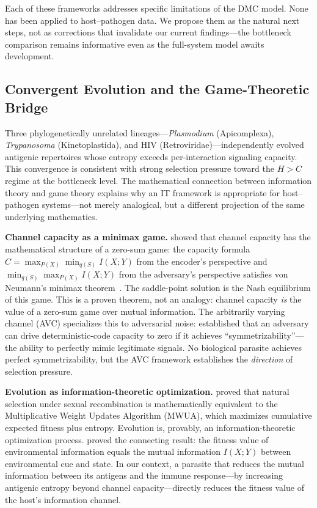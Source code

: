 \documentclass[twocolumn,10pt]{article}
\begin{document}
Each of these frameworks addresses specific limitations of the DMC model.  None has been applied to host--pathogen data.  We propose them as the natural next steps, not as corrections that invalidate our current findings---the bottleneck comparison remains informative even as the full-system model awaits development.

\subsection{Convergent Evolution and the Game-Theoretic Bridge}
\label{sec:convergence}

Three phylogenetically unrelated lineages---\textit{Plasmodium} (Apicomplexa), \textit{Trypanosoma} (Kinetoplastida), and HIV (Retroviridae)---independently evolved antigenic repertoires whose entropy exceeds per-interaction signaling capacity.  This convergence is consistent with strong selection pressure toward the $H > C$ regime at the bottleneck level.  The mathematical connection between information theory and game theory explains why an IT framework is appropriate for host--pathogen systems---not merely analogical, but a different projection of the same underlying mathematics.

\textbf{Channel capacity as a minimax game.}  \citet{gallager1968} showed that channel capacity has the mathematical structure of a zero-sum game: the capacity formula $C = \max_{P(X)} \min_{q(S)} I(X;Y)$ from the encoder's perspective and $\min_{q(S)} \max_{P(X)} I(X;Y)$ from the adversary's perspective satisfies von Neumann's minimax theorem~\citep{vonneumann1928}.  The saddle-point solution is the Nash equilibrium of this game.  This is a proven theorem, not an analogy: channel capacity \emph{is} the value of a zero-sum game over mutual information.  The arbitrarily varying channel (AVC) specializes this to adversarial noise: \citet{csiszar1988} established that an adversary can drive deterministic-code capacity to zero if it achieves ``symmetrizability''---the ability to perfectly mimic legitimate signals.  No biological parasite achieves perfect symmetrizability, but the AVC framework establishes the \emph{direction} of selection pressure.

\textbf{Evolution as information-theoretic optimization.}  \citet{chastain2014} proved that natural selection under sexual recombination is mathematically equivalent to the Multiplicative Weight Updates Algorithm (MWUA), which maximizes cumulative expected fitness plus entropy.  Evolution is, provably, an information-theoretic optimization process.  \citet{bergstrom2005} proved the connecting result: the fitness value of environmental information equals the mutual information $I(X;Y)$ between environmental cue and state.  In our context, a parasite that reduces the mutual information between its antigens and the immune response---by increasing antigenic entropy beyond channel capacity---directly reduces the fitness value of the host's information channel.
\end{document}
